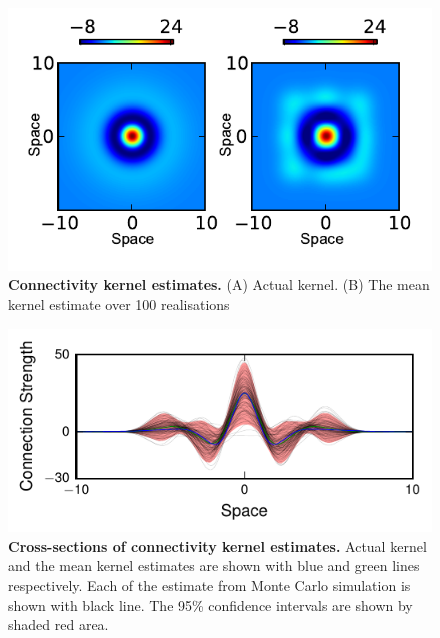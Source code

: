 \documentclass[]{article}
\begin{document}
\begin{figure}[!ht]
\begin{center}
\includegraphics{./Figures/KernelEstimate.pdf}
\end{center}
\caption{{\bf Connectivity kernel estimates.} (A) Actual kernel. (B) The mean kernel estimate over 100 realisations}
\label{fig:KernelEstimates}
\end{figure}
\begin{figure}[!ht]
\begin{center}
\includegraphics{./Figures/KernelEstimateCrossSection.pdf}
\end{center}
\caption{{\bf Cross-sections of connectivity kernel estimates.} Actual kernel and the mean kernel estimates are shown with blue and green lines respectively. Each of the estimate from Monte Carlo simulation is shown with black line. The 95\% confidence intervals are shown by shaded red area.}
\label{fig:KernelEstimateCrossSection}
\end{figure}
\end{document}
